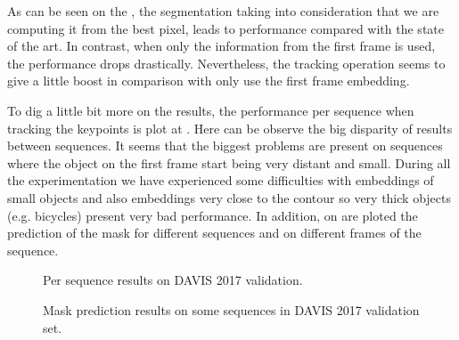 As can be seen on the , the segmentation taking into consideration that we are computing it from the best pixel, leads to performance compared with the state of the art.
In contrast, when only the information from the first frame is used, the performance drops drastically.
Nevertheless, the tracking operation seems to give a little boost in comparison with only use the first frame embedding.

To dig a little bit more on the results, the performance per sequence when tracking the keypoints is plot at .
Here can be observe the big disparity of results between sequences.
It seems that the biggest problems are present on sequences where the object on the first frame start being very distant and small.
During all the experimentation we have experienced some difficulties with embeddings of small objects and also embeddings very close to the contour so very thick objects (e.g. bicycles) present very bad performance.
In addition, on  are ploted the prediction of the mask for different sequences and on different frames of the sequence.

\begin{figure}[h]
  \centering
  
  \caption{Per sequence results on DAVIS 2017 validation. }
  \label{fig:per_sequence_miou}
\end{figure}



\begin{figure}[h]
  \centering
  \caption{Mask prediction results on some sequences in DAVIS 2017 validation set. }
  \label{fig:pred_masks_davis}
\end{figure}
